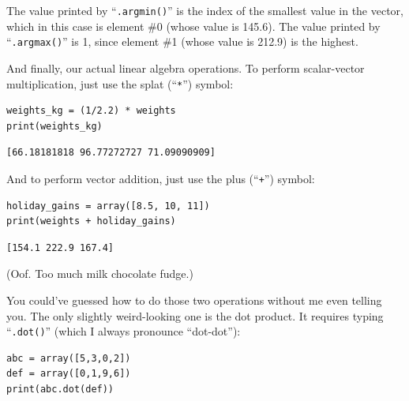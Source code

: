The value printed by ``\texttt{.argmin()}'' is the index of the smallest value
in the vector, which in this case is element \#0 (whose value is 145.6). 
The value printed by ``\texttt{.argmax()}'' is 1, since element \#1 (whose
value is 212.9) is the highest.

\bigskip

\pagebreak
{}
And finally, our actual linear algebra operations. To perform scalar-vector
multiplication, just use the splat (``\texttt{*}'') symbol:

\begin{Verbatim}[fontsize=\small,samepage=true,frame=single,framesep=3mm]
weights_kg = (1/2.2) * weights
print(weights_kg)
\end{Verbatim}
\vspace{-.2in}

\begin{Verbatim}[fontsize=\small,samepage=true,frame=leftline,framesep=5mm,framerule=1mm]
[66.18181818 96.77272727 71.09090909]
\end{Verbatim}

And to perform vector addition, just use the plus (``\texttt{+}'') symbol:

\begin{Verbatim}[fontsize=\small,samepage=true,frame=single,framesep=3mm]
holiday_gains = array([8.5, 10, 11])
print(weights + holiday_gains)
\end{Verbatim}
\vspace{-.2in}

\begin{Verbatim}[fontsize=\small,samepage=true,frame=leftline,framesep=5mm,framerule=1mm]
[154.1 222.9 167.4]
\end{Verbatim}

(Oof. Too much milk chocolate fudge.)

\smallskip


You could've guessed how to do those two operations without me even telling
you. The only slightly weird-looking one is the dot product. It requires typing
``\texttt{.dot()}'' (which I always pronounce ``dot-dot''):

\begin{Verbatim}[fontsize=\small,samepage=true,frame=single,framesep=3mm]
abc = array([5,3,0,2])
def = array([0,1,9,6])
print(abc.dot(def))

\end{Verbatim}
\vspace{-.2in}

